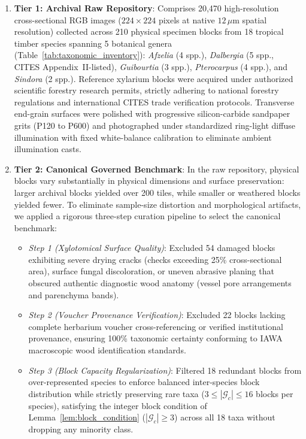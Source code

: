 \documentclass[a4paper,fleqn]{cas-sc}
\begin{document}
\begin{enumerate}
\item \textbf{Tier 1: Archival Raw Repository}: Comprises 20,470 high-resolution cross-sectional RGB images ($224 \times 224$ pixels at native $12\,\mu\text{m}$ spatial resolution) collected across 210 physical specimen blocks from 18 tropical timber species spanning 5 botanical genera (Table~\ref{tab:taxonomic_inventory}): \textit{Afzelia} (4 spp.), \textit{Dalbergia} (5 spp., CITES Appendix~II-listed), \textit{Guibourtia} (3 spp.), \textit{Pterocarpus} (4 spp.), and \textit{Sindora} (2 spp.). Reference xylarium blocks were acquired under authorized scientific forestry research permits, strictly adhering to national forestry regulations and international CITES trade verification protocols. Transverse end-grain surfaces were polished with progressive silicon-carbide sandpaper grits (P120 to P600) and photographed under standardized ring-light diffuse illumination with fixed white-balance calibration to eliminate ambient illumination casts.
\item \textbf{Tier 2: Canonical Governed Benchmark}: In the raw repository, physical blocks vary substantially in physical dimensions and surface preservation: larger archival blocks yielded over 200 tiles, while smaller or weathered blocks yielded fewer. To eliminate sample-size distortion and morphological artifacts, we applied a rigorous three-step curation pipeline to select the canonical benchmark:
  \begin{itemize}
  \item \emph{Step 1 (Xylotomical Surface Quality)}: Excluded 54 damaged blocks exhibiting severe drying cracks (checks exceeding 25\% cross-sectional area), surface fungal discoloration, or uneven abrasive planing that obscured authentic diagnostic wood anatomy (vessel pore arrangements and parenchyma bands).
  \item \emph{Step 2 (Voucher Provenance Verification)}: Excluded 22 blocks lacking complete herbarium voucher cross-referencing or verified institutional provenance, ensuring 100\% taxonomic certainty conforming to IAWA macroscopic wood identification standards.
  \item \emph{Step 3 (Block Capacity Regularization)}: Filtered 18 redundant blocks from over-represented species to enforce balanced inter-species block distribution while strictly preserving rare taxa ($3 \le |\mathcal{G}_c| \le 16$ blocks per species), satisfying the integer block condition of Lemma~\ref{lem:block_condition} ($|\mathcal{G}_c| \ge 3$) across all 18 taxa without dropping any minority class.
  \end{itemize}
\end{enumerate}
\end{document}
